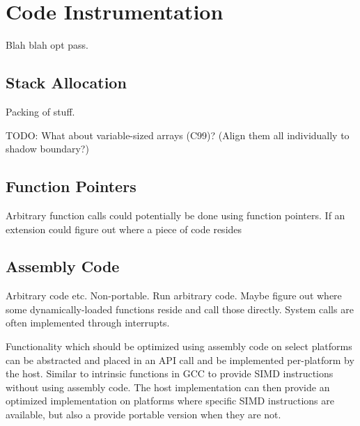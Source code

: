 \chapter {Code Instrumentation}

Blah blah opt pass.

\section {Stack Allocation}

Packing of stuff.

TODO: What about variable-sized arrays (C99)? (Align them all individually to
shadow boundary?)


\section {Function Pointers}

Arbitrary function calls could potentially be done using function pointers. If
an extension could figure out where a piece of code resides


\section {Assembly Code}

Arbitrary code etc. Non-portable. Run arbitrary code. Maybe figure out where
some dynamically-loaded functions reside and call those directly. System calls
are often implemented through interrupts. 

Functionality which should be optimized using assembly code on select platforms
can be abstracted and placed in an API call and be implemented per-platform by
the host. Similar to intrinsic functions in GCC to provide SIMD instructions
without using assembly code. The host implementation can then provide an
optimized implementation on platforms where specific SIMD instructions are
available, but also a provide portable version when they are not.
